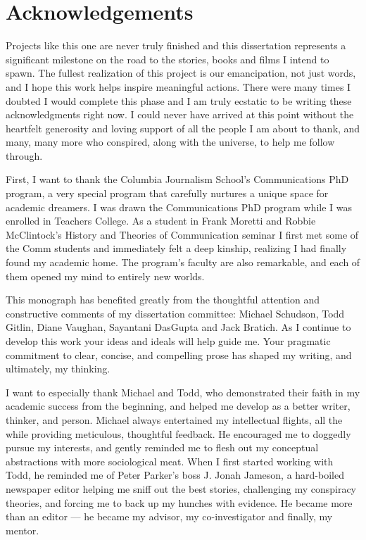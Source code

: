\chapter*{Acknowledgements}
\label{sec:acknowledgement}\vspace*{-10mm}


\bigskip
\bigskip
\bigskip

Projects like this one are never truly finished and this dissertation
represents a significant milestone on the road to the stories, books and
films I intend to spawn. The fullest realization of this project is our
emancipation, not just words, and I hope this work helps inspire
meaningful actions. There were many times I doubted I would complete
this phase and I am truly ecstatic to be writing these acknowledgments
right now. I could never have arrived at this point without the
heartfelt generosity and loving support of all the people I am about to
thank, and many, many more who conspired, along with the universe, to
help me follow through.

First, I want to thank the Columbia Journalism School's Communications
PhD program, a very special program that carefully nurtures a unique
space for academic dreamers. I was drawn the Communications PhD program
while I was enrolled in Teachers College. As a student in Frank Moretti
and Robbie McClintock's History and Theories of Communication seminar I
first met some of the Comm students and immediately felt a deep kinship,
realizing I had finally found my academic home. The program's faculty
are also remarkable, and each of them opened my mind to entirely new
worlds.

This monograph has benefited greatly from the thoughtful attention and
constructive comments of my dissertation committee: Michael Schudson,
Todd Gitlin, Diane Vaughan, Sayantani DasGupta and Jack Bratich. As I
continue to develop this work your ideas and ideals will help guide me.
Your pragmatic commitment to clear, concise, and compelling prose has
shaped my writing, and ultimately, my thinking.

I want to especially thank Michael and Todd, who demonstrated their
faith in my academic success from the beginning, and helped me develop
as a better writer, thinker, and person. Michael always entertained my
intellectual flights, all the while providing meticulous, thoughtful
feedback. He encouraged me to doggedly pursue my interests, and gently
reminded me to flesh out my conceptual abstractions with more
sociological meat. When I first started working with Todd, he reminded
me of Peter Parker's boss J. Jonah Jameson, a hard-boiled newspaper
editor helping me sniff out the best stories, challenging my conspiracy
theories, and forcing me to back up my hunches with evidence. He became
more than an editor --- he became my advisor, my co-investigator and
finally, my mentor.

